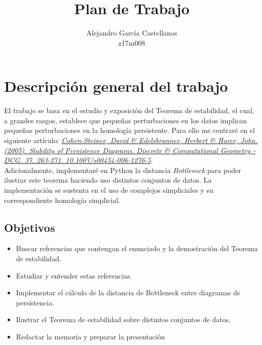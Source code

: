 \documentclass[a4paper, 12pt]{article}
\title{Plan de Trabajo}
\author{Alejandro García Castellanos\\z17m008}
\begin{document}
\maketitle 

\section{Descripción general del trabajo}
El trabajo se basa en el estudio y exposición del Teorema de estabilidad, el cual, a grandes rasgos, establece que pequeñas perturbaciones en los datos implican pequeñas perturbaciones en la homología persistente. Para ello me centraré en el siguiente artículo: \textit{\href{https://link.springer.com/content/pdf/10.1007/s00454-006-1276-5.pdf}{Cohen-Steiner, David \& Edelsbrunner, Herbert \& Harer, John. (2005). Stability of Persistence Diagrams. Discrete \& Computational Geometry - DCG. 37. 263-271. 10.1007/s00454-006-1276-5}}.\\

Adicionalmente, implementaré en Python la distancia \textit{Bottleneck} para poder ilustrar este teorema haciendo uso distintos conjuntos de datos. La implementación se sustenta en el uso de complejos simpliciales y su correspondiente homología simplicial.

\subsection*{Objetivos}
\begin{itemize}
	\item Buscar referencias que contengan el enunciado y la demostración del Teorema de estabilidad.
	\item Estudiar y entender estas referencias.
	\item Implementar el cálculo de la distancia de Bottleneck entre diagramas de persistencia.
	\item Ilustrar el Teorema de estabilidad sobre distintos conjuntos de datos.
	\item Redactar la memoria y preparar la presentación
\end{itemize}
\end{document}
